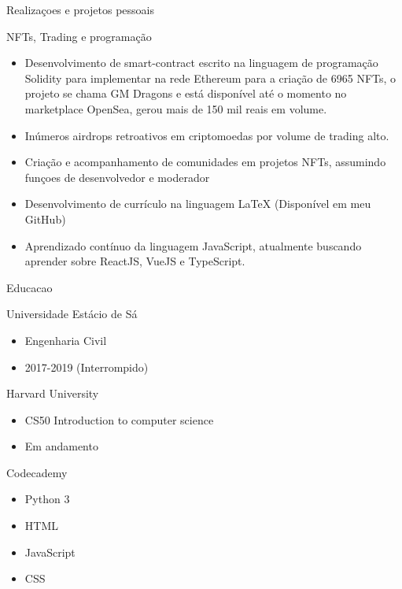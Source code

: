 \documentclass{article}
\newlength{\tabin}
\newlength{\secsep}
\newcommand{\lineunder}{\vspace*{-8pt} \\ \hspace*{-6pt} \hrulefill \\ \vspace*{-15pt}}
\newenvironment{tabbedsection}[1]{
  \begin{list}{}{
      \setlength{\itemsep}{0pt}
      \setlength{\labelsep}{0pt}
      \setlength{\labelwidth}{0pt}
      \setlength{\leftmargin}{\tabin}
      \setlength{\rightmargin}{\tabin}
      \setlength{\listparindent}{0pt}
      \setlength{\parsep}{0pt}
      \setlength{\parskip}{0pt}
      \setlength{\partopsep}{0pt}
      \setlength{\topsep}{#1}
    }
  \item[]
}{\end{list}}
\newenvironment{resume_section}[1]{
  \filbreak
  \vspace{2\secsep}
  \textsc{\large\color{sectionblue}#1}
  \lineunder
  \begin{tabbedsection}{\secsep}
}{\end{tabbedsection}}
\newenvironment{resume_subsection}[2][]{
  \textbf{#2} \hfill {\footnotesize #1} \hspace{2em}
  \begin{tabbedsection}{0.5\secsep}
}{\end{tabbedsection}}
\newenvironment{subitems}{
  \renewcommand{\labelitemi}{-}
  \begin{itemize}
      \setlength{\labelsep}{1em}
}{\end{itemize}}
\begin{document}
\begin{resume_section}{Realizaçoes e projetos pessoais}
  \begin{resume_subsection}[(2021/2022)]{NFTs, Trading e programação}
  \begin{subitems}
    \item Desenvolvimento de smart-contract escrito na linguagem de programação Solidity para implementar na rede Ethereum para a criação de 6965 NFTs, o projeto se chama GM Dragons e está disponível até o momento no marketplace OpenSea, gerou mais de 150 mil reais em volume.
    \item Inúmeros airdrops retroativos em criptomoedas por volume de trading alto.
    \item Criação e acompanhamento de comunidades em projetos NFTs, assumindo funçoes de desenvolvedor e moderador
    \item Desenvolvimento de currículo na linguagem LaTeX (Disponível em meu GitHub)
    \item Aprendizado contínuo da linguagem JavaScript, atualmente buscando aprender sobre ReactJS, VueJS e TypeScript.
    \end{subitems}
  \end{resume_subsection}

\begin{resume_section}{Educacao}
  \begin{resume_subsection}{Universidade Estácio de Sá}
    \begin{subitems}
      \item Engenharia Civil
      \item 2017-2019 (Interrompido)
       \end{subitems}
  \end{resume_subsection}
    
  \begin{resume_subsection}[Online]{Harvard University}
    \begin{subitems}
      \item CS50 Introduction to computer science
      \item Em andamento
     \end{subitems}
    \begin{resume_subsection}[Online]{Codecademy}
    \begin{subitems}
      \item Python 3
      \item HTML
    \item JavaScript
      \item CSS
     \end{subitems}   
  \end{resume_subsection}
    \end{resume_subsection}
\end{resume_section}

\end{resume_section}
\end{document}
